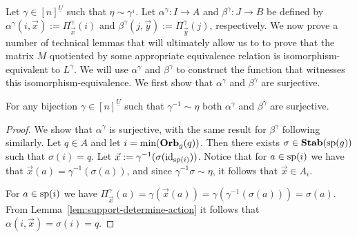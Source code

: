 \documentclass[../paper.tex]{subfiles}
\begin{document}
Let $\gamma \in [n]^{\underline{U}}$ such that $\eta \sim \gamma^{_1}$. Let
$\alpha^{\gamma}: I \rightarrow A$ and $\beta^{\gamma}: J \rightarrow B$ be
defined by $\alpha^{\gamma} (i, \vec{x}) := \Pi^{\gamma}_{\vec{x}}(i)$ and
$\beta^{\gamma} (j, \vec{y}) := \Pi^{\gamma}_{\vec{y}}(j)$, respectively. We now
prove a number of technical lemmas that will ultimately allow us to to prove
that the matrix $M$ quotiented by some appropriate equivalence relation is
isomorphism-equivalent to $L^{\gamma}$. We will use $\alpha^{\gamma}$ and
$\beta^{\gamma}$ to construct the function that witnesses this
isomorphism-equivalence. We first show that $\alpha^{\gamma}$ and
$\beta^{\gamma}$ are surjective.

\begin{lem} 
	For any bijection $\gamma \in [n]^{\underline{U}}$ such that $\gamma^{-1} \sim
  \eta$ both $\alpha^{\gamma}$ and $\beta^{\gamma}$ are surjective.
  \label{lem:alpha-beta-surjective}
\end{lem}
\begin{proof}
	We show that $\alpha^{\gamma}$ is surjective, with the same result for
  $\beta^{\gamma}$ following similarly. Let $q \in A$ and let $i = \min
  (\text{\textbf{Orb}}_{g} (q))$. Then there exists $\sigma \in \text{\textbf{Stab}} (\text{sp} (g))$ such that $\sigma
  (i) = q$. Let $\vec{x} := \gamma^{-1} (\sigma (\operatorname{id}_{\text{sp}(i)}))$. Notice that
  for $a \in \text{sp}(i)$ we have that $\vec{x}(a) = \gamma^{-1} (\sigma (a))$,
  and since $\gamma^{-1} \sigma \sim \eta$, it follows that $\vec{x} \in A_i$.
		
	For $a \in \text{sp}(i)$ we have $\Pi^{\gamma}_{\vec{x}} (a) = \gamma
  (\vec{x}(a)) = \gamma (\gamma^{-1} (\sigma (a))) = \sigma (a)$. From
  Lemma~\ref{lem:support-determine-action} it follows that $\alpha(i, \vec{x}) =
  \sigma(i) = q$.
\end{proof}



\end{document}
